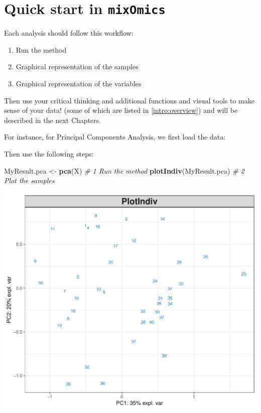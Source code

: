 \documentclass[]{book}
\newenvironment{Shaded}{\begin{snugshade}}{\end{snugshade}}
\newcommand{\CommentTok}[1]{\textcolor[rgb]{0.56,0.35,0.01}{\textit{#1}}}
\newcommand{\KeywordTok}[1]{\textcolor[rgb]{0.13,0.29,0.53}{\textbf{#1}}}
\newcommand{\NormalTok}[1]{#1}
\newcommand{\OperatorTok}[1]{\textcolor[rgb]{0.81,0.36,0.00}{\textbf{#1}}}
\newcommand{\StringTok}[1]{\textcolor[rgb]{0.31,0.60,0.02}{#1}}
\providecommand{\tightlist}{%
  \setlength{\itemsep}{0pt}\setlength{\parskip}{0pt}}
\begin{document}
\hypertarget{start:PCA}{%
\section{\texorpdfstring{Quick start in \texttt{mixOmics}}{Quick start in mixOmics}}\label{start:PCA}}

Each analysis should follow this workflow:

\begin{enumerate}
\def\labelenumi{\arabic{enumi}.}
\tightlist
\item
  Run the method
\item
  Graphical representation of the samples
\item
  Graphical representation of the variables
\end{enumerate}

Then use your critical thinking and additional functions and visual tools to make sense of your data! (some of which are listed in \ref{intro:overview}) and will be described in the next Chapters.

For instance, for Principal Components Analysis, we first load the data:

\begin{Shaded}
\end{Shaded}

Then use the following steps:

\begin{Shaded}
\begin{Highlighting}[]
\NormalTok{MyResult.pca <-}\StringTok{ }\KeywordTok{pca}\NormalTok{(X)  }\CommentTok{# 1 Run the method}
\KeywordTok{plotIndiv}\NormalTok{(MyResult.pca) }\CommentTok{# 2 Plot the samples}
\end{Highlighting}
\end{Shaded}

\begin{center}\includegraphics[width=0.5\linewidth,]{Figures/02-pca-nutrimouse-1} \end{center}
\end{document}
